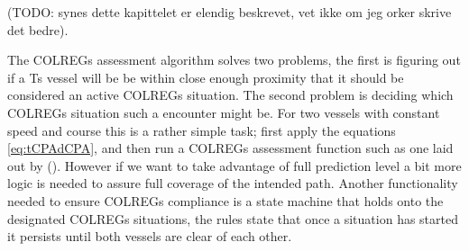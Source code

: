 
(TODO: synes dette kapittelet er elendig beskrevet, vet ikke om jeg orker skrive det bedre).

The COLREGs assessment algorithm solves two problems, the first is figuring out if a \gls{Ts} vessel will be be within close enough proximity that it should be considered
an active COLREGs situation. The second problem is deciding which COLREGs situation such a encounter might be. For two vessels with constant speed and course this is a rather
simple task; first apply the equations \eqref{eq:tCPAdCPA}, and then run a COLREGs assessment function such as one laid out by (\cite{Thyri2021b}). However if we want
to take advantage of full prediction level a bit more logic is needed to assure full coverage of the intended path. Another functionality needed to ensure COLREGs compliance
is a state machine that holds onto the designated COLREGs situations, the rules state that once a situation has started it persists until both vessels are clear of each other.

